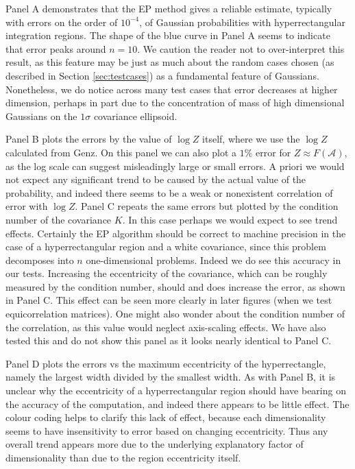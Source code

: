 \documentclass[twoside,11pt]{article}
\def\regionA{\mathcal{A}}
\begin{document}
Panel A demonstrates that the EP method gives a reliable estimate, typically with errors on the order of $10^{-4}$, of Gaussian probabilities with hyperrectangular integration regions.  The shape of the blue curve in Panel A seems to indicate that error peaks around $n=10$.  We caution the reader not to over-interpret this result, as this feature may be just as much about the random cases chosen (as described in Section \ref{sec:testcases}) as a fundamental feature of Gaussians.  Nonetheless, we do notice across many test cases that error decreases at higher dimension, perhaps in part due to the concentration of mass of high dimensional Gaussians on the $1\sigma$ covariance ellipsoid.

Panel B plots the errors by the value of $\log Z$ itself, where we use the $\log Z$ calculated from Genz.  On this panel we can also plot a $1\%$ error for $Z\approx F(\regionA)$, as the log scale can suggest misleadingly large or small errors.  A priori we would not expect any significant trend to be caused by the actual value of the probability, and indeed there seems to be a weak or nonexistent correlation of error with $\log Z$.  Panel C repeats the same errors but plotted by the condition number of the covariance $K$.   In this case perhaps we would expect to see trend effects.  Certainly the EP algorithm should be correct to machine precision in the case of a hyperrectangular region and a white covariance, since this problem decomposes into $n$ one-dimensional problems.  Indeed we do see this accuracy in our tests.  Increasing the eccentricity of the covariance, which can be roughly measured by the condition number, should and does increase the error, as shown in Panel C.  This effect can be seen more clearly in later figures (when we test equicorrelation matrices).  One might also wonder about the condition number of the correlation, as this value would neglect axis-scaling effects.  We have also tested this and do not show this panel as it looks nearly identical to Panel C.  

Panel D plots the errors vs the maximum eccentricity of the hyperrectangle, namely the largest width divided by the smallest width.  As with Panel B, it is unclear why the eccentricity of a hyperrectangular region should have bearing on the accuracy of the computation, and indeed there appears to be little effect.  The colour coding helps to clarify this lack of effect, because each dimensionality seems to have insensitivity to error based on changing eccentricity.  Thus any overall trend appears more due to the underlying explanatory factor of dimensionality than due to the region eccentricity itself.  
\end{document}
